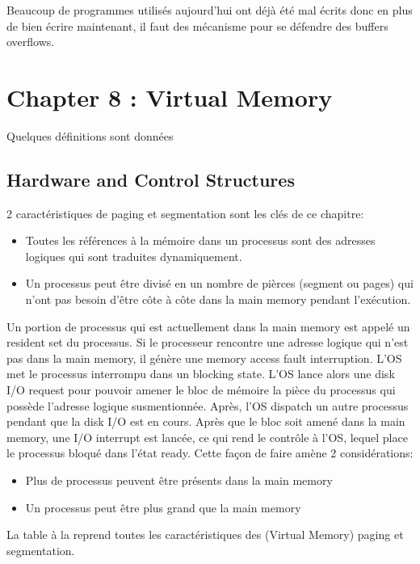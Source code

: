 Beaucoup de programmes utilisés aujourd'hui ont déjà été mal écrits donc en plus
de bien écrire maintenant, il faut des mécanisme pour se défendre des buffers
overflows.

\newpage


\section{Chapter 8 : Virtual Memory}
Quelques définitions sont données \cite[p.~361]{stallings}

\subsection{Hardware and Control Structures}
2 caractéristiques de paging et segmentation sont les clés de ce chapitre:
\begin{itemize}
  \item Toutes les références à la mémoire dans un processus sont des adresses logiques qui sont traduites dynamiquement.
  \item Un processus peut être divisé en un nombre de pièrces (segment ou pages) qui n'ont pas besoin d'être côte à côte dans la main memory pendant l'exécution.
\end{itemize}
Un portion de processus qui est actuellement dans la main memory est appelé un resident set du processus.
Si le processeur rencontre une adresse logique qui n'est pas dans la main memory, il génère une memory access fault interruption.
L'OS met le processus interrompu dans un blocking state.
L'OS lance alors une disk I/O request pour pouvoir amener le bloc de mémoire la pièce du processus qui possède l'adresse logique susmentionnée.
Après, l'OS dispatch un autre processus pendant que la disk I/O est en cours.
Après que le bloc soit amené dans la main memory, une I/O interrupt est lancée, ce qui rend le contrôle à l'OS, lequel place le processus bloqué dans l'état ready.
Cette façon de faire amène 2 considérations:
\begin{itemize}
  \item Plus de processus peuvent être présents dans la main memory
  \item Un processus peut être plus grand que la main memory
\end{itemize}
La table à la \cite[p.~363]{stallings} reprend toutes les caractéristiques des (Virtual Memory) paging et segmentation.


